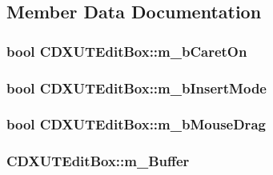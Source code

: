 \subsection{Member Data Documentation}
\hypertarget{class_c_d_x_u_t_edit_box_a2a7a67ef2c2104a2d62a00517915f59b}{
\subsubsection[{m\_\-bCaretOn}]{\setlength{\rightskip}{0pt plus 5cm}bool {\bf CDXUTEditBox::m\_\-bCaretOn}}}
\label{class_c_d_x_u_t_edit_box_a2a7a67ef2c2104a2d62a00517915f59b}
\hypertarget{class_c_d_x_u_t_edit_box_adb1eaad549f7da1b5eca182d45454fc3}{
\subsubsection[{m\_\-bInsertMode}]{\setlength{\rightskip}{0pt plus 5cm}bool {\bf CDXUTEditBox::m\_\-bInsertMode}}}
\label{class_c_d_x_u_t_edit_box_adb1eaad549f7da1b5eca182d45454fc3}
\hypertarget{class_c_d_x_u_t_edit_box_a09b9f704dcf36c70e025c30d32d5d218}{
\subsubsection[{m\_\-bMouseDrag}]{\setlength{\rightskip}{0pt plus 5cm}bool {\bf CDXUTEditBox::m\_\-bMouseDrag}}}
\label{class_c_d_x_u_t_edit_box_a09b9f704dcf36c70e025c30d32d5d218}
\hypertarget{class_c_d_x_u_t_edit_box_afb55f6d88b6d994cf61227f7afb5f719}{
\subsubsection[{m\_\-Buffer}]{ {\bf CDXUTEditBox::m\_\-Buffer}}}
